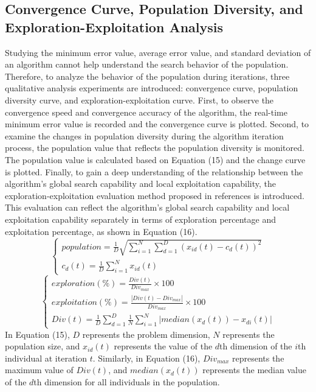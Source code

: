 \documentclass[preprint,review,compress,12pt]{elsarticle}
\begin{document}
\subsection{Convergence Curve, Population Diversity, and Exploration-Exploitation Analysis}
Studying the minimum error value, average error value, and standard deviation of an algorithm cannot help understand the search behavior of the population. Therefore, to analyze the behavior of the population during iterations, three qualitative analysis experiments are introduced: convergence curve, population diversity curve, and exploration-exploitation curve. First, to observe the convergence speed and convergence accuracy of the algorithm, the real-time minimum error value is recorded and the convergence curve is plotted. Second, to examine the changes in population diversity during the algorithm iteration process, the population value that reflects the population diversity is monitored. The population value is calculated based on Equation (15) and the change curve is plotted. Finally, to gain a deep understanding of the relationship between the algorithm's global search capability and local exploitation capability, the exploration-exploitation evaluation method proposed in references \cite{cheng2014population,hussain2019exploration,morales2020better} is introduced. This evaluation can reflect the algorithm's global search capability and local exploitation capability separately in terms of exploration percentage and exploitation percentage, as shown in Equation (16).
\begin{equation}
    \left\{\begin{matrix}population = \frac{1}{D} \sqrt{ {\textstyle \sum_{i=1}^{N}}{\textstyle \sum_{d=1}^{D}}(x_{id}(t)-c_d(t))^2 }   \\c_d(t) = \frac{1}{D} {\textstyle \sum_{i=1}^{N}}{x_{id}(t)}\end{matrix}\right.
\end{equation}
\begin{equation}
    \left\{\begin{matrix}exploration \left ( \% \right )=\frac{Div(t)}{Div_{max}}\times 100  \\exploitation \left ( \% \right )= \frac{\left | Div(t)-Div_{max} \right | }{Div_{max}}\times 100 \\Div(t) = \frac{1}{D}  {\textstyle \sum_{d=1}^{D}} \frac{1}{N} {\textstyle \sum_{i=1}^{N}}\left | median(x_d(t))-x_{di}(t) \right | \end{matrix}\right.
\end{equation}
In Equation (15), $D$ represents the problem dimension, $N$ represents the population size, and $x_{id}(t)$ represents the value of the $d$th dimension of the $i$th individual at iteration $t$. Similarly, in Equation (16), $Div_{max}$ represents the maximum value of $Div(t)$, and $median(x_d(t))$ represents the median value of the $d$th dimension for all individuals in the population.
\end{document}
